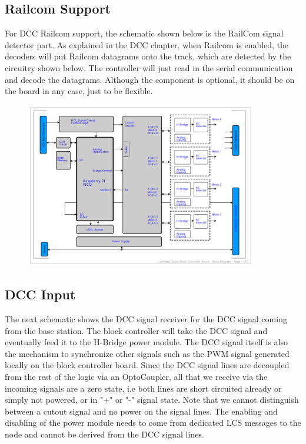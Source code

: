 \subsection{Railcom Support}

For DCC Railcom support, the schematic shown below is the RailCom signal detector part. As explained in the DCC chapter, when Railcom is enabled, the decoders will put Railcom datagrams onto the track, which are detected by the circuitry shown below. The controller will just read in the serial communication and decode the datagrams. Although the component is optional, it should be on the board in any case, just to be flexible.

\begin{figure}[htbp]
    \centering
    \includegraphics[page=5, width=0.9\textwidth]{./Schematics/Schematic_LcsNodes-Quad-Block-Controller.pdf}
\end{figure}
\FloatBarrier

\subsection{DCC Input}

The next schematic shows the DCC signal receiver for the DCC signal coming from the base station. The block controller will take the DCC signal and eventually feed it to the H-Bridge power module. The DCC signal itself is also the mechanism to synchronize other signals such as the PWM signal generated locally on the block controller board. Since the DCC signal lines are decoupled from the rest of the logic via an OptoCoupler, all that we receive via the incoming signals are a zero state, i.e both lines are short circuited already or simply not powered, or in "+" or "-" signal state. Note that we cannot distinguish between a cutout signal and no power on the signal lines. The enabling and disabling of the power module needs to come from dedicated LCS messages to the node and cannot be derived from the DCC signal lines.

